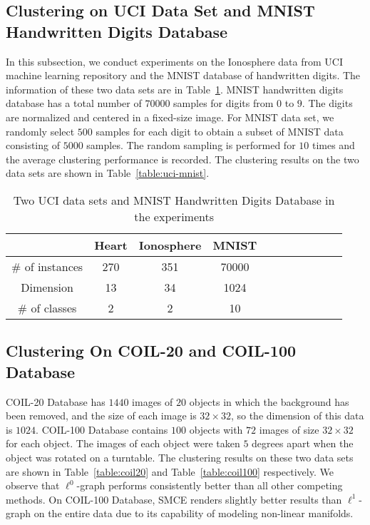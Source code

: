 \documentclass[10pt,twocolumn,letterpaper]{article}
\begin{document}
\subsection{Clustering on UCI Data Set and MNIST Handwritten Digits Database}
In this subsection, we conduct experiments on the Ionosphere data from UCI machine learning repository \cite{Asuncion07} and the MNIST database of handwritten digits. The information of these two data sets are in Table~\ref{table:datasets}. MNIST handwritten digits database has a total number of $70000$ samples for digits from $0$ to $9$. The digits are normalized and centered in a fixed-size image. For MNIST data set, we randomly select $500$ samples for each digit to obtain a subset of MNIST data consisting of $5000$ samples. The random sampling is performed for $10$ times and the average clustering performance is recorded. The clustering results on the two data sets are shown in Table~\ref{table:uci-mnist}.
\begin{table}[h]
\centering
\small
\caption{Two UCI data sets and MNIST Handwritten Digits Database in the experiments}
\begin{tabular}{|c|c|c|c|c|c|c|c|c|c|c|}
  \hline
                       &Heart &Ionosphere  &MNIST                \\\hline
  \# of instances      &270  &351          &70000                         \\ \hline
  Dimension            &13   &34           &1024                         \\ \hline
  \# of classes        &2    &2            &10                    \\ \hline
\end{tabular}
\label{table:datasets}
\end{table}

\subsection{Clustering On COIL-20 and COIL-100 Database}
COIL-20 Database has $1440$ images of $20$ objects in which the background has been removed, and the size of each image is $32 \times 32$, so the dimension of this data is $1024$. COIL-100 Database contains $100$ objects with $72$ images of size $32 \times 32$ for each object. The images of each object were taken $5$ degrees apart when the object was rotated on a turntable. The clustering results on these two data sets are shown in Table~\ref{table:coil20} and Table~\ref{table:coil100} respectively. We observe that $\ell^{0}$-graph performs consistently better than all other competing methods. On COIL-100 Database, SMCE renders slightly better results than $\ell^{1}$-graph on the entire data due to its capability of modeling non-linear manifolds.
\end{document}
